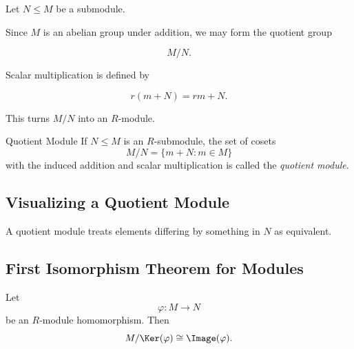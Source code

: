 Let \(N\leq M\) be a submodule.

Since \(M\) is an abelian group under addition, we may form the quotient
group

\[ M/N. \]

Scalar multiplication is defined by

\[ r(m+N)=rm+N. \]

This turns \(M/N\) into an \(R\)-module.

\begin{definitionbox}{Quotient Module}
If \(N\leq M\) is an \(R\)-submodule, the set of cosets
\[ M/N=\{m+N:m\in M\} \]
with the induced addition and scalar multiplication is called the
\emph{quotient module}.
\end{definitionbox}

\subsection{Visualizing a Quotient Module}
\label{subsec:quotient-module-visual}

A quotient module treats elements differing by something in \(N\) as
equivalent.

\begin{center}
\end{center}

\subsection{First Isomorphism Theorem for Modules}
\label{subsec:first-isomorphism-modules}

\begin{theorem}
Let
\[ \varphi:M\to N \]
be an \(R\)-module homomorphism. Then
\[ M/\Ker(\varphi)\cong\Image(\varphi). \]
\end{theorem}

